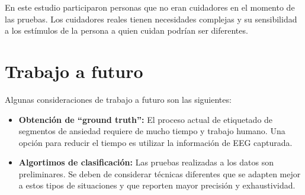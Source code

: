 	En este estudio participaron personas que no eran cuidadores en el momento de las pruebas. Los cuidadores reales tienen necesidades complejas y su sensibilidad a los est\'imulos de la persona a quien cuidan podr\'ian ser diferentes.
\section{Trabajo a futuro}
Algunas consideraciones de trabajo a futuro son las siguientes:

\begin{itemize}
	\item \textbf{Obtenci\'on de ``ground truth'':} El proceso actual de etiquetado de segmentos de ansiedad requiere de mucho tiempo y trabajo humano. Una opci\'on para reducir el tiempo es utilizar la informaci\'on de EEG capturada.
	\item \textbf{Algortimos de clasificaci\'on:} Las pruebas realizadas a los datos son preliminares. Se deben de considerar t\'ecnicas diferentes que se adapten mejor a estos tipos de situaciones y que reporten mayor precisi\'on y exhaustividad.

\end{itemize}
